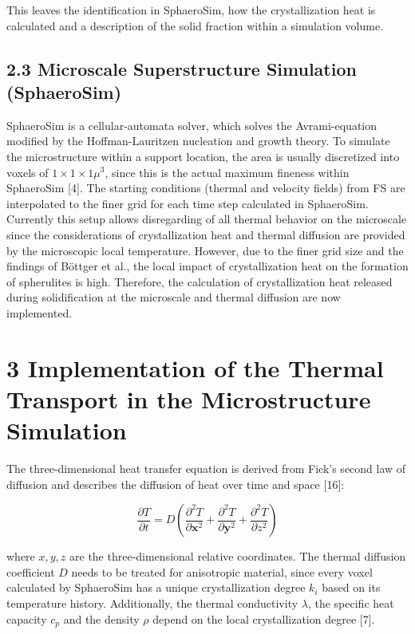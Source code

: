 \documentclass[10pt]{article}
\begin{document}
This leaves the identification in SphaeroSim, how the crystallization heat is calculated and a description of the solid fraction within a simulation volume.

\subsection*{2.3 Microscale Superstructure Simulation (SphaeroSim)}
SphaeroSim is a cellular-automata solver, which solves the Avrami-equation modified by the Hoffman-Lauritzen nucleation and growth theory. To simulate the microstructure within a support location, the area is usually discretized into voxels of $1 \times 1 \times 1 \mu^{3}$, since this is the actual maximum fineness within SphaeroSim [4]. The starting conditions (thermal and velocity fields) from FS are interpolated to the finer grid for each time step calculated in SphaeroSim. Currently this setup allows disregarding of all thermal behavior on the microscale since the considerations of crystallization heat and thermal diffusion are provided by the microscopic local temperature. However, due to the finer grid size and the findings of Böttger et al., the local impact of crystallization heat on the formation of spherulites is high. Therefore, the calculation of crystallization heat released during solidification at the microscale and thermal diffusion are now implemented.

\section*{3 Implementation of the Thermal Transport in the Microstructure Simulation}
The three-dimensional heat transfer equation is derived from Fick's second law of diffusion and describes the diffusion of heat over time and space [16]:


\begin{equation*}
\frac{\partial T}{\partial t}=D\left(\frac{\partial^{2} T}{\partial \boldsymbol{x}^{2}}+\frac{\partial^{2} T}{\partial \boldsymbol{y}^{2}}+\frac{\partial^{2} T}{\partial z^{2}}\right) \tag{3}
\end{equation*}


where $x, y, z$ are the three-dimensional relative coordinates. The thermal diffusion coefficient $D$ needs to be treated for anisotropic material, since every voxel calculated by SphaeroSim has a unique crystallization degree $k_{i}$ based on its temperature history. Additionally, the thermal conductivity $\lambda$, the specific heat capacity $c_{p}$ and the density $\rho$ depend on the local crystallization degree [7].
\end{document}
